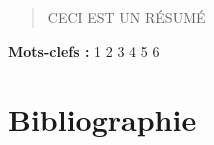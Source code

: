 \documentclass[a4paper,12pt]{article}
\newcommand{\zitat}[2]{\#Citation#1(#2)\#}
\begin{document}
%
%




\newpage
\begin{abstract}
CECI EST UN RÉSUMÉ
\end{abstract}
\bigskip
\textbf{Mots-clefs :} 1 2 3 4 5 6

\newpage
\nocite{*}
\section{Bibliographie}
\printbibliography
\end{document}
